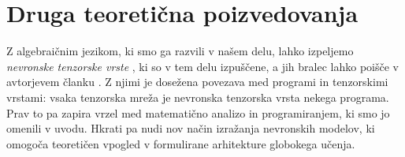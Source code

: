 \documentclass[a4paper, 12pt]{book}
\begin{document}
\section{Druga teoretična poizvedovanja}

Z algebraičnim jezikom, ki smo ga razvili v našem delu, lahko izpeljemo \emph{nevronske tenzorske vrste} \cite{opCalProg}, ki so v tem delu izpuščene, a jih bralec lahko poišče v avtorjevem članku \cite{opCalProg}. Z njimi je dosežena povezava med programi in tenzorskimi vrstami: vsaka tenzorska mreža je nevronska tenzorska vrsta nekega programa. Prav to pa zapira vrzel med matematično analizo in programiranjem, ki smo jo omenili v uvodu. Hkrati pa nudi nov način izražanja nevronskih modelov, ki omogoča teoretičen vpogled v formulirane arhitekture globokega učenja.

\newpage %
\ \\
\clearpage
{}


\end{document}
